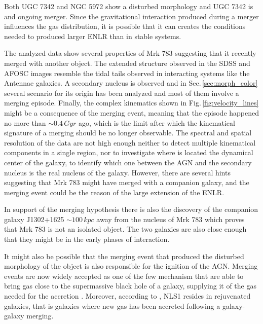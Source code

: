 \documentclass[../thesis.tex]{subfiles}
\begin{document}
Both UGC 7342 and NGC 5972 show a disturbed morphology and UGC 7342 is and ongoing merger.
Since the gravitational interaction produced during a merger influences the gas distribution, it is possible that it can creates the conditions needed to produced larger ENLR than in stable systems.

The analyzed data show several properties of Mrk 783 suggesting that it recently merged with another object.
The extended structure observed in the SDSS and AFOSC images resemble the tidal tails observed in interacting systems like the Antennae galaxies.
A secondary nucleus is observed and in Sec.\,\ref{sec:morph_color} several scenario for its origin has been analyzed and most of them involve a merging episode.
Finally, the complex kinematics shown in Fig.\,\ref{fig:velocity_lines} might be a consequence of the merging event, meaning that the episode happened no more than $\sim 0.4\,\si{Gyr}$ ago, which is the limit after which the kinematical signature of a merging should be no longer observable.
The spectral and spatial resolution of the data are not high enough neither to detect multiple kinematical components in a single region, nor to investigate where is located the dynamical center of the galaxy, to identify which one between the AGN and the secondary nucleus is the real nucleus of the galaxy.
However, there are several hints suggesting that Mrk 783 might have merged with a companion galaxy, and the merging event could be the reason of the large extension of the ENLR.

In support of the merging hypothesis there is also the discovery of the companion galaxy J1302+1625 $\sim100\,\si{kpc}$ away from the nucleus of Mrk 783 which proves that Mrk 783 is not an isolated object.
The two galaxies are also close enough that they might be in the early phases of interaction.

It might also be possible that the merging event that produced the disturbed morphology of the object is also responsible for the ignition of the AGN.
Merging events are now widely accepted as one of the few mechanism that are able to bring gas close to the supermassive black hole of a galaxy, supplying it of the gas needed for the accretion \citep{Sanders88,Hong15}.
Moreover, according to \citet{Mathur00}, NLS1 resides in rejuvenated galaxies, that is galaxies where new gas has been accreted following a galaxy-galaxy merging.
\end{document}
